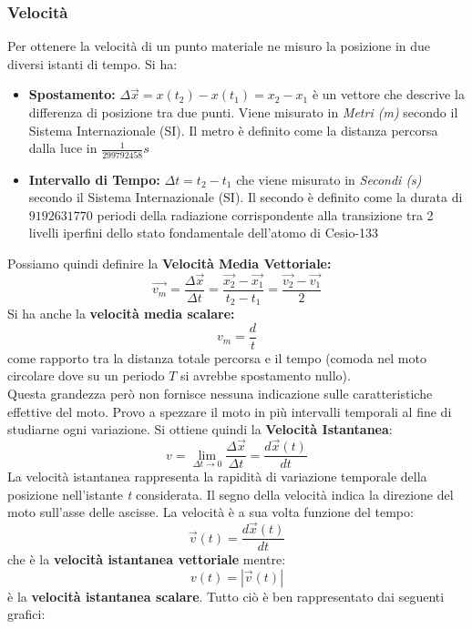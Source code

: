 \documentclass[a4paper,12pt, oneside]{book}
\begin{document}
\subsubsection{Velocità}
Per ottenere la velocità di un punto materiale ne misuro la posizione in due diversi istanti di tempo. Si ha:
\begin{itemize}
	\item \textbf{Spostamento:} $\Delta \vec{x}= x(t_2)-x(t_1)=x_2-x_1$ è un vettore che descrive la differenza di posizione tra due punti. Viene misurato in \textit{Metri (m)} secondo il Sistema Internazionale (SI). Il metro è definito come la distanza percorsa dalla luce in $\frac{1}{299792458}s$
	\item \textbf{Intervallo di Tempo:} $\Delta t=t_2-t_1$ che viene misurato in \textit{Secondi (s)} secondo il Sistema Internazionale (SI). Il secondo è definito come la durata di $9192631770$ periodi della radiazione corrispondente alla transizione tra 2 livelli iperfini dello stato fondamentale dell'atomo di Cesio-133
\end{itemize}
Possiamo quindi definire la \textbf{Velocità Media Vettoriale:}
$$\vec{v_m}=\frac{\Delta \vec{x}}{\Delta t}=\frac{\vec{x_2}-\vec{x_1}}{t_2-t_1}=\frac{\vec{v_2}-\vec{v_1}}{2}$$
Si ha anche la \textbf{velocità media scalare:}
$$v_m=\frac{d}{t}$$
come rapporto tra la distanza totale percorsa e il tempo (comoda nel moto circolare dove su un periodo $T$ si avrebbe spostamento nullo).\\
Questa grandezza però non fornisce nessuna indicazione sulle caratteristiche effettive del moto. Provo a spezzare il moto in più intervalli temporali al fine di studiarne ogni variazione. Si ottiene quindi la \textbf{Velocità Istantanea}:
$$v=\lim_{\Delta t \to 0}\frac{\Delta \vec{x}}{\Delta t}=\frac{d \vec{x}(t)}{d t}$$
La velocità istantanea rappresenta la rapidità di variazione temporale della posizione nell'istante \textit{t} considerata. Il segno della velocità indica la direzione del moto sull'asse delle ascisse. La velocità è a sua volta funzione del tempo:
$$\vec{v}(t)=\frac{d\vec{x}(t)}{dt}$$
che è la \textbf{velocità istantanea vettoriale} mentre:
$$v(t)=|\vec{v}(t)|$$
è la \textbf{velocità istantanea scalare}.
Tutto ciò è ben rappresentato dai seguenti grafici:
\end{document}
